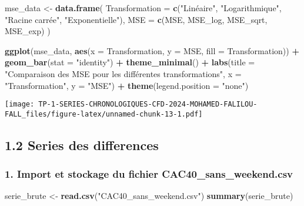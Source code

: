 \documentclass[
]{article}
\newenvironment{Shaded}{\begin{snugshade}}{\end{snugshade}}
\newcommand{\AttributeTok}[1]{\textcolor[rgb]{0.13,0.29,0.53}{#1}}
\newcommand{\FunctionTok}[1]{\textcolor[rgb]{0.13,0.29,0.53}{\textbf{#1}}}
\newcommand{\NormalTok}[1]{#1}
\newcommand{\OtherTok}[1]{\textcolor[rgb]{0.56,0.35,0.01}{#1}}
\newcommand{\SpecialCharTok}[1]{\textcolor[rgb]{0.81,0.36,0.00}{\textbf{#1}}}
\newcommand{\StringTok}[1]{\textcolor[rgb]{0.31,0.60,0.02}{#1}}
\begin{document}
\begin{Shaded}
\begin{Highlighting}[]
\NormalTok{mse\_data }\OtherTok{\textless{}{-}} \FunctionTok{data.frame}\NormalTok{(}
  \AttributeTok{Transformation =} \FunctionTok{c}\NormalTok{(}\StringTok{"Linéaire"}\NormalTok{, }\StringTok{"Logarithmique"}\NormalTok{, }\StringTok{"Racine carrée"}\NormalTok{, }\StringTok{"Exponentielle"}\NormalTok{),}
  \AttributeTok{MSE =} \FunctionTok{c}\NormalTok{(MSE, MSE\_log, MSE\_sqrt, MSE\_exp)}
\NormalTok{)}

\FunctionTok{ggplot}\NormalTok{(mse\_data, }\FunctionTok{aes}\NormalTok{(}\AttributeTok{x =}\NormalTok{ Transformation, }\AttributeTok{y =}\NormalTok{ MSE, }\AttributeTok{fill =}\NormalTok{ Transformation)) }\SpecialCharTok{+}
  \FunctionTok{geom\_bar}\NormalTok{(}\AttributeTok{stat =} \StringTok{"identity"}\NormalTok{) }\SpecialCharTok{+}
  \FunctionTok{theme\_minimal}\NormalTok{() }\SpecialCharTok{+}
  \FunctionTok{labs}\NormalTok{(}\AttributeTok{title =} \StringTok{"Comparaison des MSE pour les différentes transformations"}\NormalTok{,}
       \AttributeTok{x =} \StringTok{"Transformation"}\NormalTok{,}
       \AttributeTok{y =} \StringTok{"MSE"}\NormalTok{) }\SpecialCharTok{+}
  \FunctionTok{theme}\NormalTok{(}\AttributeTok{legend.position =} \StringTok{"none"}\NormalTok{)}
\end{Highlighting}
\end{Shaded}

\texttt{[image: TP-1-SERIES-CHRONOLOGIQUES-CFD-2024-MOHAMED-FALILOU-FALL\_files/figure-latex/unnamed-chunk-13-1.pdf]}

\subsection{1.2 Series des differences}\label{series-des-differences}

\subsubsection{1. Import et stockage du fichier
CAC40\_sans\_weekend.csv}\label{import-et-stockage-du-fichier-cac40_sans_weekend.csv}

\begin{Shaded}
\begin{Highlighting}[]
\NormalTok{serie\_brute }\OtherTok{\textless{}{-}} \FunctionTok{read.csv}\NormalTok{(}\StringTok{"CAC40\_sans\_weekend.csv"}\NormalTok{)}
\FunctionTok{summary}\NormalTok{(serie\_brute)}
\end{Highlighting}
\end{Shaded}
\end{document}
